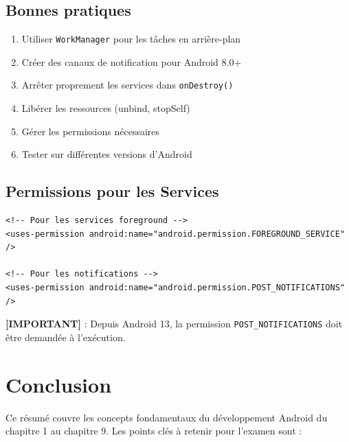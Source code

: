 \documentclass[11pt,a4paper]{article}
\begin{document}
\subsection{Bonnes pratiques}

\begin{enumerate}
    \item Utiliser \texttt{WorkManager} pour les tâches en arrière-plan
    \item Créer des canaux de notification pour Android 8.0+
    \item Arrêter proprement les services dans \texttt{onDestroy()}
    \item Libérer les ressources (unbind, stopSelf)
    \item Gérer les permissions nécessaires
    \item Tester sur différentes versions d'Android
\end{enumerate}

\subsection{Permissions pour les Services}

\begin{lstlisting}[style=XML]
<!-- Pour les services foreground -->
<uses-permission android:name="android.permission.FOREGROUND_SERVICE" />

<!-- Pour les notifications -->
<uses-permission android:name="android.permission.POST_NOTIFICATIONS" />
\end{lstlisting}

\textbf{[IMPORTANT]} : Depuis Android 13, la permission \texttt{POST\_NOTIFICATIONS} doit être demandée à l'exécution.


\newpage
\section{Conclusion}

Ce résumé couvre les concepts fondamentaux du développement Android du chapitre 1 au chapitre 9. Les points clés à retenir pour l'examen sont :
\end{document}
